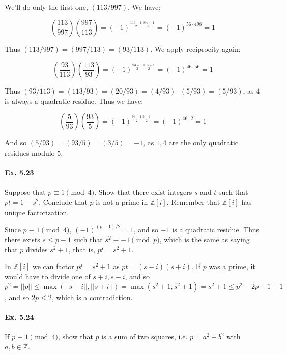 \documentclass[notitlepage]{article}
\theoremstyle{definition}
\newcommand\Z{\mathbb{Z}}
\begin{document}
We'll do only the first one, $(113/997)$. We have:

\begin{equation}
  \left(\frac{113}{997}\right)\left(\frac{997}{113}\right) =
  (-1)^{\frac{113-1}{2}\frac{997-1}{2}} = (-1)^{56 \cdot 498} = 1
\end{equation}

Thus $(113/997) = (997/113) = (93/113)$. We apply reciprocity again:

\begin{equation}
  \left(\frac{93}{113}\right)\left(\frac{113}{93}\right) =
  (-1)^{\frac{93-1}{2}\frac{113-1}{2}} = (-1)^{46 \cdot 56} = 1
\end{equation}

Thus $(93/113) = (113/93) = (20/93) = (4/93)\cdot(5/93) = (5/93)$, as
$4$ is always a quadratic residue. Thus we have:

\begin{equation}
  \left(\frac{5}{93}\right)\left(\frac{93}{5}\right) =
  (-1)^{\frac{93-1}{2}\frac{5-1}{2}} = (-1)^{46 \cdot 2} = 1
\end{equation}

And so $(5/93) = (93/5) = (3/5) = -1$, as $1, 4$ are the only
quadratic residues modulo $5$.

\paragraph{Ex. 5.23}
Suppose that $p \equiv 1 \pmod 4$. Show that there exist integers $s$
and $t$ such that $pt = 1 + s^2$.  Conclude that $p$ is not a prime in
$\Z[i]$. Remember that $\Z[i]$ has unique factorization.

Since $p \equiv 1 \pmod 4$, $(-1)^{(p-1)/2} = 1$, and so $-1$ is a
quadratic residue. Thus there exists $s \leq p-1$ such that $s^2
\equiv -1 \pmod p$, which is the same as saying that $p$ divides $s^2
+ 1$, that is, $pt = s^2 + 1$. 

In $\Z[i]$ we can factor $pt = s^2 + 1$ as $pt = (s-i)(s+i)$. If $p$
was a prime, it would have to divide one of $s+i, s-i$, and so $p^2 =
||p|| \leq \max(||s-i||, ||s+i||) = \max(s^2 + 1, s^2 + 1) = s^2 + 1
\leq p^2 - 2p + 1 + 1$, and so $2p \leq 2$, which is a contradiction.

\paragraph{Ex. 5.24}
If $p \equiv 1 \pmod 4$, show that $p$ is a sum of two squares,
i.e. $p = a^2 + b^2$ with $a, b \in \Z$.
\end{document}
